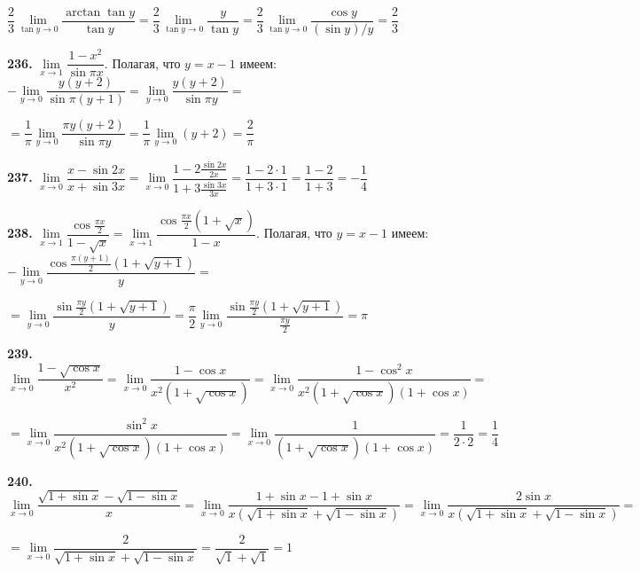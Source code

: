 \documentclass[12pt]{article}
\begin{document}
	$
	\dfrac{2}{3}\lim\limits_{\tan y\to0} \dfrac{\arctan\tan y}{\tan y} = \dfrac{2}{3}\lim\limits_{\tan y\to0}\dfrac{y}{\tan y} = \dfrac{2}{3}\lim\limits_{\tan y\to0} \dfrac{\cos y}{(\sin y)/y} = \dfrac{2}{3}
	$
	
	\medskip
	{\bf 236.} $\lim\limits_{x\to1}\dfrac{1-x^2}{\sin \pi x}$. Полагая, что $y=x-1$ имеем: $-\lim\limits_{y\to0}\dfrac{y(y+2)}{\sin \pi(y+1)} = \lim\limits_{y\to0}\dfrac{y(y+2)}{\sin\pi y} = $

	$
	= \dfrac{1}{\pi}\lim\limits_{y\to0} \dfrac{\pi y(y+2)}{\sin \pi y}	= \dfrac{1}{\pi}\lim\limits_{y\to0}(y+2) = \dfrac{2}{\pi}
	$	
	
	\medskip
	{\bf 237.} $\lim\limits_{x\to0}\dfrac{x-\sin 2x}{x+\sin 3x} = \lim\limits_{x\to0} \dfrac{1-2\frac{\sin 2x}{2x}}{1+3\frac{\sin 3x}{3x}} = \dfrac{1-2\cdot1}{1+3\cdot1} = \dfrac{1-2}{1+3} = -\dfrac{1}{4}$
	
	\medskip
	{\bf 238.} $\lim\limits_{x\to1}\dfrac{\cos \frac{\pi x}{2}}{1-\sqrt{x}} = \lim\limits_{x\to1} \dfrac{\cos \frac{\pi x}{2}(1+\sqrt{x})}{1-x}$. Полагая, что $y=x-1$ имеем: $-\lim\limits_{y\to0}\dfrac{\cos\frac{\pi(y+1)}{2}(1+\sqrt{y+1})}{y}=$
	
	$
	= \lim\limits_{y\to0} \dfrac{\sin \frac{\pi y}{2}(1+\sqrt{y+1})}{y} = \dfrac{\pi}{2}\lim\limits_{y\to0}\dfrac{\sin \frac{\pi y}{2}(1+\sqrt{y+1})}{\frac{\pi y}{2}}  = \pi
	$
	
	{\bf 239.} $\lim\limits_{x\to0} \dfrac{1-\sqrt{\cos x}}{x^2}= \lim\limits_{x\to0} \dfrac{1-\cos x}{x^2(1+\sqrt{\cos x})} = \lim\limits_{x\to0} \dfrac{1-\cos^2 x}{x^2(1+\sqrt{\cos x})(1+\cos x)} = $
	
	$
	=\lim\limits_{x\to0} \dfrac{\sin^2 x}{x^2(1+\sqrt{\cos x})(1+\cos x)} = \lim\limits_{x\to0} \dfrac{1}{(1+\sqrt{\cos x})(1+\cos x)}= \dfrac{1}{2\cdot2} = \dfrac{1}{4}
	$
	
	\medskip
	{\bf 240.} $\lim\limits_{x\to0}\dfrac{\sqrt{1+\sin x}-\sqrt{1-\sin{x}}}{x} = \lim\limits_{x\to0} \dfrac{1+\sin x-1+\sin x}{x(\sqrt{1+\sin x}+\sqrt{1-\sin x})} = \lim\limits_{x\to0} \dfrac{2\sin x}{x(\sqrt{1+\sin x}+\sqrt{1-\sin x})} = $
	
	$
	=\lim\limits_{x\to0} \dfrac{2}{\sqrt{1+\sin x}+\sqrt{1-\sin x}} = \dfrac{2}{\sqrt{1}+\sqrt{1}} = 1
	$
	
	
	
	
	
	
	
	
	
	
	
	
	
	
	
	
	
	
	
	
	
	
	
	
	
	
	
	
	
	
	
	
	
	
	
	
	
	
	
	
\end{document}
